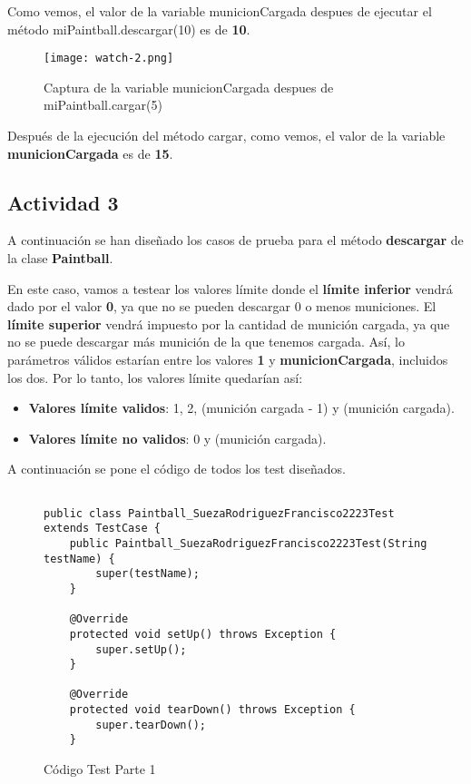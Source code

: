 Como vemos, el valor de la variable municionCargada despues de ejecutar el método miPaintball.descargar(10) es de \textbf{10}.

\begin{figure}[ht]
    \centering
    \texttt{[image: watch-2.png]}
    \caption{Captura de la variable municionCargada despues de miPaintball.cargar(5)}
\end{figure}

Después de la ejecución del método cargar, como vemos, el valor de la variable \textbf{municionCargada} es de \textbf{15}.

\subsection{Actividad 3}

A continuación se han diseñado los casos de prueba para el método \textbf{descargar} de la clase \textbf{Paintball}.

En este caso, vamos a testear los valores límite donde el \textbf{límite inferior} vendrá dado por el valor \textbf{0}, ya que no se pueden descargar 0 o menos municiones. El \textbf{límite superior} vendrá impuesto por la {cantidad de munición cargada}, ya que no se puede descargar más munición de la que tenemos cargada. Así, lo parámetros válidos estarían entre los valores \textbf{1} y \textbf{municionCargada}, incluidos los dos. Por lo tanto, los valores límite quedarían así:

\begin{itemize}
    \item \textbf{Valores límite validos}: 1, 2, (munición cargada - 1) y (munición cargada).
    \item \textbf{Valores límite no validos}: 0 y (munición cargada).
\end{itemize}

A continuación se pone el código de todos los test diseñados.

\begin{figure}[H]
    \begin{tcolorbox}[sharp corners, colback=yellow!30, colframe=white!20]
        \tiny
        \begin{verbatim}

public class Paintball_SuezaRodriguezFrancisco2223Test extends TestCase {
    public Paintball_SuezaRodriguezFrancisco2223Test(String testName) {
        super(testName);
    }

    @Override
    protected void setUp() throws Exception {
        super.setUp();
    }

    @Override
    protected void tearDown() throws Exception {
        super.tearDown();
    }
         \end{verbatim}
    \end{tcolorbox}
    \caption{Código Test Parte 1}
\end{figure}


